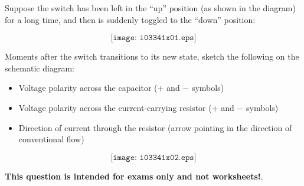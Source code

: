 

Suppose the switch has been left in the ``up'' position (as shown in the diagram) for a long time, and then is suddenly toggled to the ``down'' position:

$$\texttt{[image: i03341x01.eps]}$$

Moments after the switch transitions to its new state, sketch the following on the schematic diagram:

\begin{itemize}
\item{} Voltage polarity across the capacitor (+ and $-$ symbols)
\vskip 5pt
\item{} Voltage polarity across the current-carrying resistor (+ and $-$ symbols)
\vskip 5pt
\item{} Direction of current through the resistor (arrow pointing in the direction of conventional flow)
\end{itemize}







$$\texttt{[image: i03341x02.eps]}$$







{\bf This question is intended for exams only and not worksheets!}.



